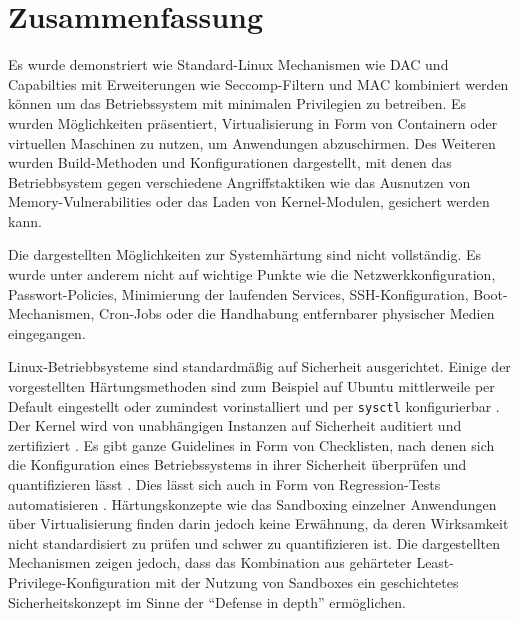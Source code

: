 
\chapter{Zusammenfassung}

Es wurde demonstriert wie Standard-Linux Mechanismen wie DAC und Capabilties mit Erweiterungen wie Seccomp-Filtern und MAC kombiniert werden können um das Betriebssystem mit minimalen Privilegien zu betreiben. Es wurden Möglichkeiten präsentiert, Virtualisierung in Form von Containern oder virtuellen Maschinen zu nutzen, um Anwendungen abzuschirmen. Des Weiteren wurden Build-Methoden und Konfigurationen dargestellt, mit denen das Betriebbsystem gegen verschiedene Angriffstaktiken
wie das Ausnutzen von Memory-Vulnerabilities oder das Laden von Kernel-Modulen, gesichert werden kann.

Die dargestellten Möglichkeiten zur Systemhärtung sind nicht vollständig. Es wurde unter anderem nicht auf wichtige Punkte wie die Netzwerkkonfiguration, Passwort-Policies, Minimierung der laufenden Services, SSH-Konfiguration, Boot-Mechanismen, Cron-Jobs oder die Handhabung entfernbarer physischer Medien eingegangen.

Linux-Betriebbsysteme sind standardmäßig auf Sicherheit ausgerichtet. Einige der vorgestellten Härtungsmethoden sind zum Beispiel auf Ubuntu mittlerweile per Default eingestellt oder zumindest vorinstalliert und per \texttt{sysctl} konfigurierbar \cite{ubuntu-security-features}. Der Kernel wird von unabhängigen Instanzen auf Sicherheit auditiert und zertifiziert \cite{ubuntu-certifications}. Es gibt ganze Guidelines in Form von Checklisten, nach denen sich die Konfiguration eines Betriebssystems in
ihrer Sicherheit überprüfen und quantifizieren lässt \cite{cis}. Dies lässt sich auch in Form von Regression-Tests automatisieren \cite{qa-regression}. Härtungskonzepte wie das Sandboxing einzelner Anwendungen über Virtualisierung finden darin jedoch keine Erwähnung, da deren Wirksamkeit nicht standardisiert zu prüfen und schwer zu quantifizieren ist. Die dargestellten Mechanismen zeigen jedoch, dass das Kombination aus gehärteter Least-Privilege-Konfiguration mit der Nutzung von
Sandboxes ein geschichtetes Sicherheitskonzept im Sinne der ``Defense in depth'' ermöglichen.
